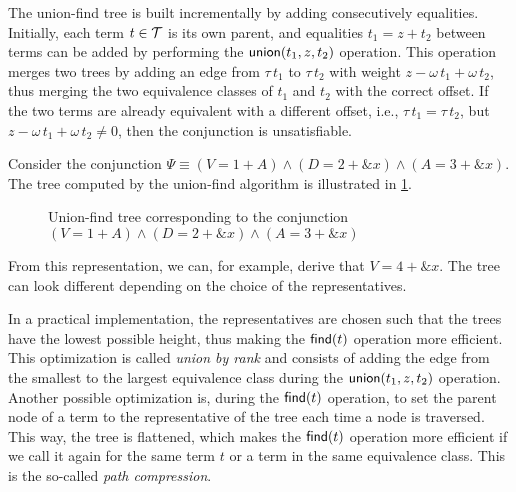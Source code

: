 The union-find tree is built incrementally by adding consecutively equalities.
Initially, each term $t\in\mathcal{T}$ is its own parent, and equalities $t_1 = z + t_2$ between terms can be added by performing the $\textsf{union}(t_1, z, t_2)$ operation.
This operation merges two trees by adding an edge from $\tau\,t_1$ to $\tau\,t_2$ with weight $z - \omega\,t_1 + \omega\,t_2$,
thus merging the two equivalence classes of $t_1$ and $t_2$ with the correct offset.
If the two terms are already equivalent with a different offset, i.e., $\tau\,t_1 = \tau\,t_2$, but $z - \omega\,t_1 + \omega\,t_2 \neq 0$, then the conjunction is unsatisfiable.

\begin{example}
  Consider the conjunction $\Psi \equiv (V = 1 + A) \land (D = 2 + \&x) \land (A = 3 + \&x)$.
  The tree computed by the union-find algorithm is illustrated in \cref{fig:uf-tree}.
  \begin{figure}
    \caption[An example of a union-find tree.]{Union-find tree corresponding to the conjunction  $(V = 1 + A) \land (D = 2 + \&x) \land (A = 3 + \&x)$}\label{fig:uf-tree}
  \end{figure}
  From this representation, we can, for example, derive that $V = 4 + \&x$.
  The tree can look different depending on the choice of the representatives.
\end{example}

In a practical implementation, the representatives are chosen such that the trees have the lowest possible height, thus making the $\textsf{find}(t)$ operation more efficient.
This optimization is called \emph{union by rank} and consists of adding the edge from the smallest to the largest equivalence class during the $\textsf{union}(t_1, z, t_2)$ operation.
Another possible optimization is, during the $\textsf{find}(t)$ operation, to set the parent node of a term to the representative of the tree each time a node is traversed.
This way, the tree is flattened, which makes the $\textsf{find}(t)$ operation
more efficient if we call it again for the same term $t$ or a term in the same equivalence class.
This is the so-called \emph{path compression}.~\cite{uf-tarjan}

